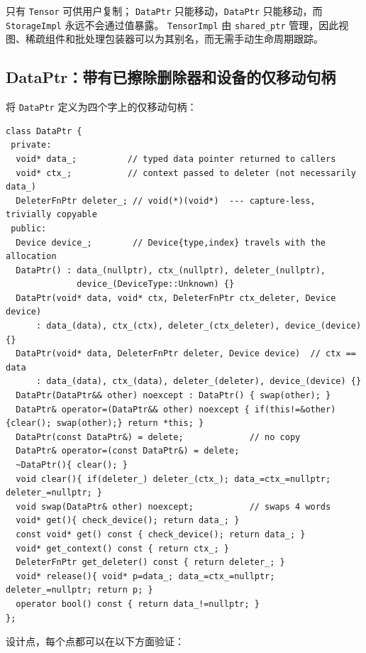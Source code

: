 只有 \texttt{Tensor} 可供用户复制； \texttt{DataPtr} 只能移动，\texttt{DataPtr} 只能移动，而 \texttt{StorageImpl} 永远不会通过值暴露。 \texttt{TensorImpl} 由 \texttt{shared\_ptr} 管理，因此视图、稀疏组件和批处理包装器可以为其别名，而无需手动生命周期跟踪。

\subsection{DataPtr：带有已擦除删除器和设备的仅移动句柄}
\label{sec:dataptr}

将 \texttt{DataPtr} 定义为四个字上的仅移动句柄：

\begin{lstlisting}[caption={move-only handle, 4 words.}, label=lst:dataptrfull]
class DataPtr {
 private:
  void* data_;          // typed data pointer returned to callers
  void* ctx_;           // context passed to deleter (not necessarily data_)
  DeleterFnPtr deleter_; // void(*)(void*)  --- capture-less, trivially copyable
 public:
  Device device_;        // Device{type,index} travels with the allocation
  DataPtr() : data_(nullptr), ctx_(nullptr), deleter_(nullptr),
              device_(DeviceType::Unknown) {}
  DataPtr(void* data, void* ctx, DeleterFnPtr ctx_deleter, Device device)
      : data_(data), ctx_(ctx), deleter_(ctx_deleter), device_(device) {}
  DataPtr(void* data, DeleterFnPtr deleter, Device device)  // ctx == data
      : data_(data), ctx_(data), deleter_(deleter), device_(device) {}
  DataPtr(DataPtr&& other) noexcept : DataPtr() { swap(other); }
  DataPtr& operator=(DataPtr&& other) noexcept { if(this!=&other){clear(); swap(other);} return *this; }
  DataPtr(const DataPtr&) = delete;             // no copy
  DataPtr& operator=(const DataPtr&) = delete;
  ~DataPtr(){ clear(); }
  void clear(){ if(deleter_) deleter_(ctx_); data_=ctx_=nullptr; deleter_=nullptr; }
  void swap(DataPtr& other) noexcept;           // swaps 4 words
  void* get(){ check_device(); return data_; }
  const void* get() const { check_device(); return data_; }
  void* get_context() const { return ctx_; }
  DeleterFnPtr get_deleter() const { return deleter_; }
  void* release(){ void* p=data_; data_=ctx_=nullptr; deleter_=nullptr; return p; }
  operator bool() const { return data_!=nullptr; }
};
\end{lstlisting}

设计点，每个点都可以在以下方面验证：

